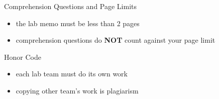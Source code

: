 \begin{frame}{Comprehension Questions and Page Limits}
\protect\hypertarget{comprehension-questions-and-page-limits}{}
\begin{itemize}
\tightlist
\item
  the lab memo must be less than 2 pages
\item
  comprehension questions do \textbf{NOT} count against your page limit
\end{itemize}
\end{frame}

\begin{frame}{Honor Code}
\protect\hypertarget{honor-code}{}
\begin{itemize}
\tightlist
\item
  each lab team must do its own work
\item
  copying other team's work is plagiarism
\end{itemize}
\end{frame}

